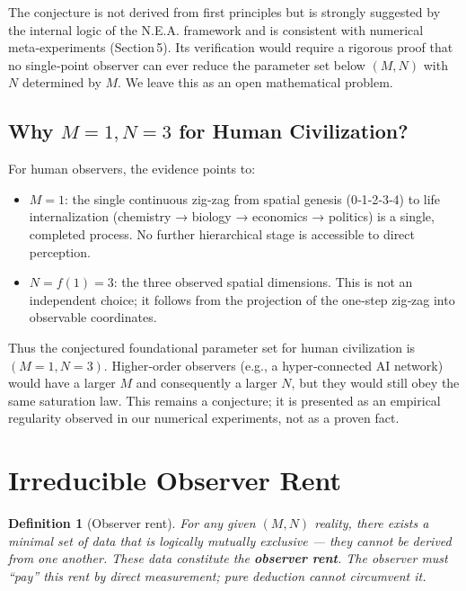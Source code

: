 \documentclass[12pt,a4paper]{article}
\newtheorem{definition}{Definition}[section]
\begin{document}
The conjecture is not derived from first principles but is strongly suggested by the internal logic of the N.E.A. framework and is consistent with numerical meta‑experiments (Section 5). Its verification would require a rigorous proof that no single‑point observer can ever reduce the parameter set below \((M, N)\) with \(N\) determined by \(M\). We leave this as an open mathematical problem.

\subsection{Why \(M=1, N=3\) for Human Civilization?}

For human observers, the evidence points to:
\begin{itemize}
    \item \(M = 1\): the single continuous zig‑zag from spatial genesis (0‑1‑2‑3‑4) to life internalization (chemistry → biology → economics → politics) is a single, completed process. No further hierarchical stage is accessible to direct perception.
    \item \(N = f(1) = 3\): the three observed spatial dimensions. This is not an independent choice; it follows from the projection of the one‑step zig‑zag into observable coordinates.
\end{itemize}
Thus the conjectured foundational parameter set for human civilization is \((M=1, N=3)\). Higher‑order observers (e.g., a hyper‑connected AI network) would have a larger \(M\) and consequently a larger \(N\), but they would still obey the same saturation law. This remains a conjecture; it is presented as an empirical regularity observed in our numerical experiments, not as a proven fact.

\section{Irreducible Observer Rent}

\begin{definition}[Observer rent]
For any given \((M, N)\) reality, there exists a minimal set of data that is logically mutually exclusive — they cannot be derived from one another. These data constitute the \textbf{observer rent}. The observer must “pay” this rent by direct measurement; pure deduction cannot circumvent it.
\end{definition}
\end{document}
